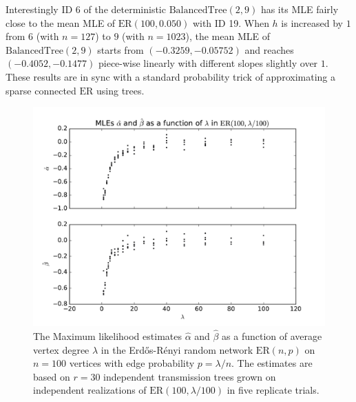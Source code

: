 \documentclass[review]{elsarticle}
\numberwithin{equation}{section}
\begin{document}
Interestingly ID 6 of the deterministic $\mathrm{BalancedTree}(2,9)$ has its MLE fairly close to the mean MLE of $\mathrm{ER}(100,0.050)$ with ID 19.  
When $h$ is increased by $1$ from $6$ (with $n=127$) to $9$ (with $n=1023$), the mean MLE of $\mathrm{BalancedTree}(2,9)$ starts from $(-0.3259, -0.05752)$ and reaches $(-0.4052, -0.1477)$ piece-wise linearly with different slopes slightly over $1$.  
These results are in sync with a standard probability trick of approximating a sparse connected $\mathrm{ER}$ using trees.  
\begin{figure}[htbp]
\begin{center}
\includegraphics[width=0.95\linewidth]{figures/MLE_ERRG_n100_r30_samp2.pdf}
\end{center}
\caption{The Maximum likelihood estimates $\hat{\alpha}$ and $\hat{\beta}$ as a function of average vertex degree $\lambda$ in the Erd\H{o}s-R\'enyi random network $\mathrm{ER}(n,p)$ on $n=100$ vertices with edge probability $p=\lambda/n$. The estimates are based on $r=30$ independent transmission trees grown on independent realizations of $\mathrm{ER}(100,\lambda/100)$ in five replicate trials.\label{F:MLE_ERRG_n100_r30_samp2}}
\end{figure}

\end{document}
